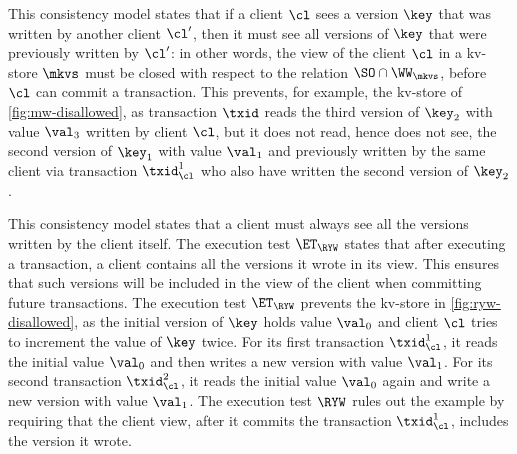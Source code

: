 This consistency model states that if a client $\cl$ sees 
a version \( \key \) that was written by another client $\cl'$, 
then it must see all versions of \( \key \) that were 
previously written by $\cl'$: in other words, 
the view of the client $\cl$  in a kv-store $\mkvs$ must be closed 
with respect to the relation $\SO \cap \WW_{\mkvs}$, 
before $\cl$ can commit a transaction.
%
This prevents, for example, the kv-store of \cref{fig:mw-disallowed}, as
transaction $\txid$ reads the third version of $\key_2$ 
with value $\val_3$ written by client $\cl$, 
but it does not read, hence does not see, the second version of $\key_1$
with value $\val_1$ and previously written by the same client via transaction \( \txid^1_{\cl} \)
who also have written the second version of \( \key_2 \).

This consistency model states that a client must always see all the versions written by the client itself. 
The execution test $\ET_{\RYW}$ states that after executing a transaction, a client 
contains all the versions it wrote in its view. This ensures that such versions will be included in the view of the client 
when committing future transactions.
The execution test $\ET_{\RYW}$ prevents the kv-store in \cref{fig:ryw-disallowed}, 
as the initial version of $\key$ holds value $\val_0$ 
and client $\cl$ tries to increment the value of $\key$ twice.  
For its first transaction \( \txid_{\cl}^1\), it reads the initial value $\val_0$ and then writes a new version with value $\val_1$. 
For its second transaction \( \txid_{\cl}^2\), it reads the initial value $\val_0$ again and write a new version with value $\val_1$.
The execution test $\RYW$ rules out the example by requiring that
the client view, after it commits the transaction  \(\txid_{\cl}^{1}\), includes the version it wrote.  

